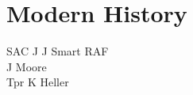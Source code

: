 \section*{Modern History}

\begin{multicols}{1}
  \small
  \noindent
  SAC J J Smart RAF \\
  J Moore \\
  Tpr K Heller \\
\end{multicols}






